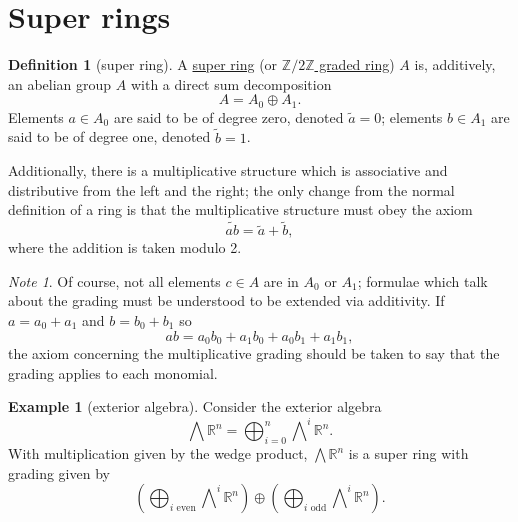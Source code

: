 \documentclass[a4paper,10pt]{scrreprt}
\newcommand{\R}{\mathbb{R}}
\newcommand{\Z}{\mathbb{Z}}
\newcommand{\defn}[1]{\ul{#1}}
\theoremstyle{definition}
\newtheorem{definition}{Definition}[section]
\newtheorem{example}{Example}[section]
\theoremstyle{plain}
\theoremstyle{remark}
\newtheorem{note}{Note}[section]
\begin{document}
\section{Super rings}
\begin{definition}[super ring]
  \label{def:superring}
  A \defn{super ring} (or \defn{$\Z/2\Z$ graded ring}) $A$ is, additively, an abelian group $A$ with a direct sum decomposition
  \begin{equation*}
    A = A_{0} \oplus A_{1}.
  \end{equation*}
  Elements $a\in A_{0}$ are said to be of degree zero, denoted $\tilde{a} = 0$; elements $b\in A_{1}$ are said to be of degree one, denoted $\tilde{b} = 1$.

  Additionally, there is a multiplicative structure which is associative and distributive from the left and the right; the only change from the normal definition of a ring is that the multiplicative structure must obey the axiom
  \begin{equation*}
    \widetilde{ab} = \tilde{a} + \tilde{b},
  \end{equation*}
  where the addition is taken modulo 2.
\end{definition}

\begin{note}
  Of course, not all elements $c \in A$ are in $A_{0}$ or $A_{1}$; formulae which talk about the grading must be understood to be extended via additivity. If $a = a_{0} + a_{1}$ and $b = b_{0} + b_{1}$ so
  \begin{equation*}
    ab = a_{0} b_{0} + a_{1} b_{0} + a_{0} b_{1} + a_{1} b_{1},
  \end{equation*}
  the axiom concerning the multiplicative grading should be taken to say that the grading applies to each monomial.
\end{note}

\begin{example}[exterior algebra]
  \label{eg:exterioralgebra}
  Consider the exterior algebra
  \begin{equation*}
    \bigwedge \R^{n} = \bigoplus_{i=0}^{n} \bigwedge\nolimits^{i} \R^{n}.
  \end{equation*}
  With multiplication given by the wedge product, $\bigwedge \R^{n}$ is a super ring with grading given by
  \begin{equation*}
    \left( \bigoplus_{i\text{ even}} \bigwedge\nolimits^{i}\R^{n} \right) \oplus \left( \bigoplus_{i\text{ odd}}\bigwedge\nolimits^{i}\R^{n} \right).
  \end{equation*}
\end{example}
\end{document}
